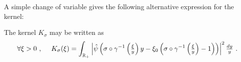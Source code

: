 A simple change of variable gives the following alternative expression for the kernel:
\begin{corollary}\label{cor_second_expression_kernel}
The kernel $K_\sigma$ may be written as
    \begin{equation}
        \forall \xi>0 \ ,\quad \ K_\sigma(\xi)= \int_{\R_+}\left|\hat{\psi}\left(\sigma\circ\gamma^{-1}\left(\tfrac{\xi}{y}\right)y-\xi_0\left(\sigma\circ\gamma^{-1}\left(\tfrac{\xi}{y}\right)-1\right)\right)\right|^2\tfrac{dy}{y}\ .
    \end{equation}
\end{corollary}


